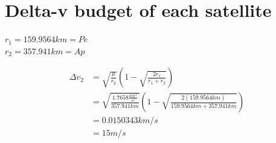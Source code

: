 \documentclass[12pt,paper=A4,numbers=noenddot,bibliography=totoc,listof=totoc,DIV=11,BCOR=1mm]{scrreprt}
\begin{document}
\section{Delta-v budget of each satellite}
\begin{flushright}
$r_{1} = 159.9564km = Pe$ \\
$r_{2} = 357.941km = Ap$
\end{flushright}
\begin{equation*}
\begin{split}
\Delta v_{2} &= \sqrt{\frac{\mu}{r_{2}}} \left( 1-\sqrt{\frac{2r_{1}}{r_{1}+r_{2}}} \right) \\
             &= \sqrt{\frac{1.7658 \frac{km^{3}}{s^{2}}}{357.941km}} \left( 1-\sqrt{\frac{2(159.9564km)}{159.9564km + 357.941km}} \right) \\
             &= 0.0150343 km/s \\
             &= 15 m/s
\end{split}
\end{equation*}
\end{document}
